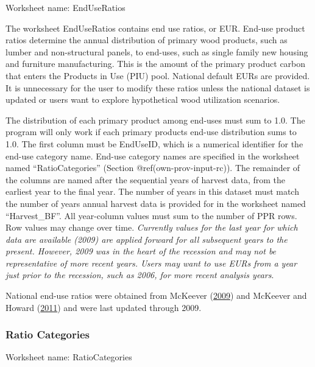 \documentclass[
  openany]{book}
\begin{document}
Worksheet name: EndUseRatios

The worksheet EndUseRatios contains end use ratios, or EUR. End-use
product ratios determine the annual distribution of primary wood
products, such as lumber and non-structural panels, to end-uses, such as
single family new housing and furniture manufacturing. This is the
amount of the primary product carbon that enters the Products in Use
(PIU) pool. National default EURs are provided. It is unnecessary for
the user to modify these ratios unless the national dataset is updated
or users want to explore hypothetical wood utilization scenarios.

The distribution of each primary product among end-uses must sum to 1.0.
The program will only work if each primary products end-use distribution
sums to 1.0. The first column must be EndUseID, which is a numerical
identifier for the end-use category name. End-use category names are
specified in the worksheet named ``RatioCategories'' (Section
@ref(own-prov-input-rc)). The remainder of the columns are named after
the sequential years of harvest data, from the earliest year to the
final year. The number of years in this dataset must match the number of
years annual harvest data is provided for in the worksheet named
``Harvest\_BF''. All year-column values must sum to the number of PPR
rows. Row values may change over time. \emph{Currently values for the
last year for which data are available (2009) are applied forward for
all subsequent years to the present. However, 2009 was in the heart of
the recession and may not be representative of more recent years. Users
may want to use EURs from a year just prior to the recession, such as
2006, for more recent analysis years}.

National end-use ratios were obtained from McKeever
(\protect\hyperlink{ref-mckeever2009}{2009}) and McKeever and Howard
(\protect\hyperlink{ref-mckeever2011}{2011}) and were last updated
through 2009.

\hypertarget{own-prov-input-rc}{%
\subsubsection{Ratio Categories}\label{own-prov-input-rc}}

Worksheet name: RatioCategories
\end{document}
